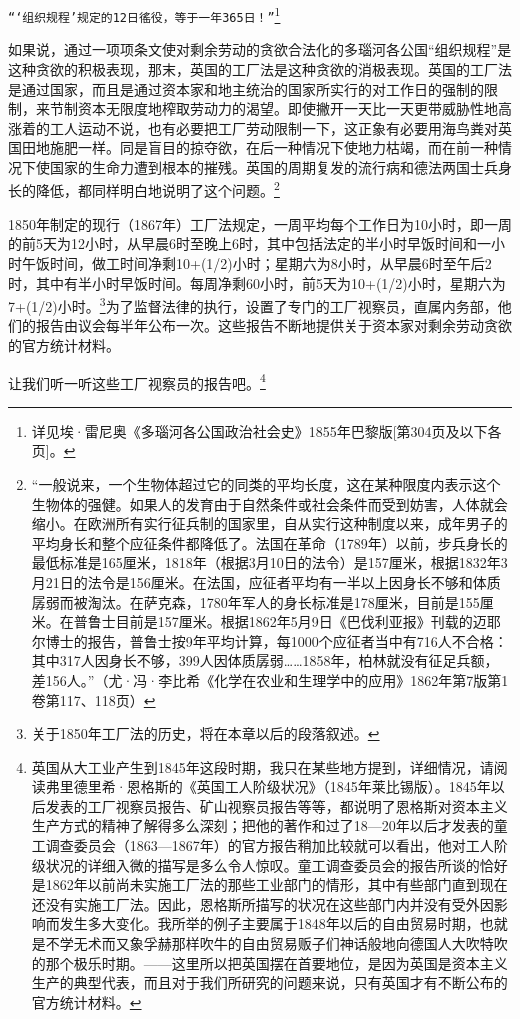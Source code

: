 \documentclass{ctexbook}
\begin{document}
    \texttt{“‘组织规程’规定的12日徭役，等于一年365日！”}\footnote{详见埃·雷尼奥《多瑙河各公国政治社会史》1855年巴黎版[第304页及以下各页]。}

    如果说，通过一项项条文使对剩余劳动的贪欲合法化的多瑙河各公国“组织规程”是这种贪欲的积极表现，那末，英国的工厂法是这种贪欲的消极表现。英国的工厂法是通过国家，而且是通过资本家和地主统治的国家所实行的对工作日的强制的限制，来节制资本无限度地榨取劳动力的渴望。即使撇开一天比一天更带威胁性地高涨着的工人运动不说，也有必要把工厂劳动限制一下，这正象有必要用海鸟粪对英国田地施肥一样。同是盲目的掠夺欲，在后一种情况下使地力枯竭，而在前一种情况下使国家的生命力遭到根本的摧残。英国的周期复发的流行病和德法两国士兵身长的降低，都同样明白地说明了这个问题。\footnote{“一般说来，一个生物体超过它的同类的平均长度，这在某种限度内表示这个生物体的强健。如果人的发育由于自然条件或社会条件而受到妨害，人体就会缩小。在欧洲所有实行征兵制的国家里，自从实行这种制度以来，成年男子的平均身长和整个应征条件都降低了。法国在革命（1789年）以前，步兵身长的最低标准是165厘米，1818年（根据3月10日的法令）是157厘米，根据1832年3月21日的法令是156厘米。在法国，应征者平均有一半以上因身长不够和体质孱弱而被淘汰。在萨克森，1780年军人的身长标准是178厘米，目前是155厘米。在普鲁士目前是157厘米。根据1862年5月9日《巴伐利亚报》刊载的迈耶尔博士的报告，普鲁士按9年平均计算，每1000个应征者当中有716人不合格：其中317人因身长不够，399人因体质孱弱……1858年，柏林就没有征足兵额，差156人。”（尤·冯·李比希《化学在农业和生理学中的应用》1862年第7版第1卷第117、118页）}

    1850年制定的现行（1867年）工厂法规定，一周平均每个工作日为10小时，即一周的前5天为12小时，从早晨6时至晚上6时，其中包括法定的半小时早饭时间和一小时午饭时间，做工时间净剩10+(1/2)小时；星期六为8小时，从早晨6时至午后2时，其中有半小时早饭时间。每周净剩60小时，前5天为10+(1/2)小时，星期六为7+(1/2)小时。\footnote{关于1850年工厂法的历史，将在本章以后的段落叙述。}为了监督法律的执行，设置了专门的工厂视察员，直属内务部，他们的报告由议会每半年公布一次。这些报告不断地提供关于资本家对剩余劳动贪欲的官方统计材料。

    让我们听一听这些工厂视察员的报告吧。\footnote{英国从大工业产生到1845年这段时期，我只在某些地方提到，详细情况，请阅读弗里德里希·恩格斯的《英国工人阶级状况》（1845年莱比锡版）。1845年以后发表的工厂视察员报告、矿山视察员报告等等，都说明了恩格斯对资本主义生产方式的精神了解得多么深刻；把他的著作和过了18—20年以后才发表的童工调查委员会（1863—1867年）的官方报告稍加比较就可以看出，他对工人阶级状况的详细入微的描写是多么令人惊叹。童工调查委员会的报告所谈的恰好是1862年以前尚未实施工厂法的那些工业部门的情形，其中有些部门直到现在还没有实施工厂法。因此，恩格斯所描写的状况在这些部门内并没有受外因影响而发生多大变化。我所举的例子主要属于1848年以后的自由贸易时期，也就是不学无术而又象孚赫那样吹牛的自由贸易贩子们神话般地向德国人大吹特吹的那个极乐时期。——这里所以把英国摆在首要地位，是因为英国是资本主义生产的典型代表，而且对于我们所研究的问题来说，只有英国才有不断公布的官方统计材料。}
    
\end{document}
